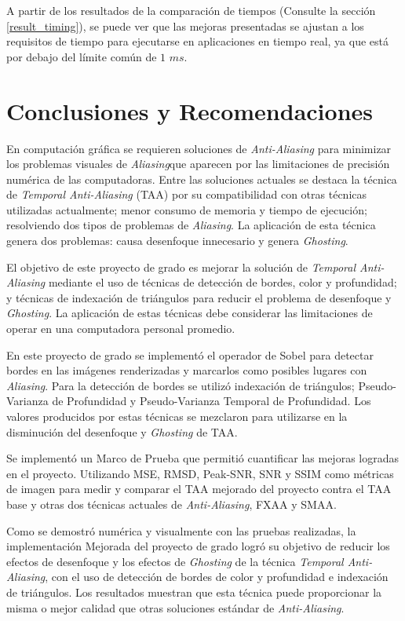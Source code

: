\documentclass[pregrado]{tesis-usb} %
\begin{document}
A partir de los resultados de la comparación de tiempos (Consulte la sección \ref{result_timing}), se puede ver que las mejoras presentadas se ajustan a los requisitos de tiempo para ejecutarse en aplicaciones en tiempo real, ya que está por debajo del límite común de $1$ $ms$.


\chapter{Conclusiones y Recomendaciones}
En computación gráfica se requieren soluciones de \textit{Anti-Aliasing} para minimizar los problemas visuales de \textit{Aliasing}que aparecen por las limitaciones de precisión numérica de las computadoras. Entre las soluciones actuales se destaca la técnica de \textit{Temporal Anti-Aliasing} (TAA) por su compatibilidad con otras técnicas utilizadas actualmente; menor consumo de memoria y tiempo de ejecución; resolviendo dos tipos de problemas de \textit{Aliasing}. La aplicación de esta técnica genera dos problemas: causa desenfoque innecesario y genera \textit{Ghosting}.

El objetivo de este proyecto de grado es mejorar la solución de \textit{Temporal Anti-Aliasing} mediante el uso de técnicas de detección de bordes, color y profundidad; y técnicas de indexación de triángulos para reducir el problema de desenfoque y \textit{Ghosting}. La aplicación de estas técnicas debe considerar las limitaciones de operar en una computadora personal promedio.

En este proyecto de grado se implementó el operador de Sobel para detectar bordes en las imágenes renderizadas y marcarlos como posibles lugares con \textit{Aliasing}. Para la detección de bordes se utilizó indexación de triángulos; Pseudo-Varianza de Profundidad y Pseudo-Varianza Temporal de Profundidad. Los valores producidos por estas técnicas se mezclaron para utilizarse en la disminución del desenfoque y \textit{Ghosting} de TAA. 

Se implementó un Marco de Prueba que permitió cuantificar las mejoras logradas en el proyecto. Utilizando MSE, RMSD, Peak-SNR, SNR y SSIM como métricas de imagen para medir y comparar el TAA mejorado del proyecto contra el TAA base y otras dos técnicas actuales de \textit{Anti-Aliasing}, FXAA y SMAA.

Como se demostró numérica y visualmente con las pruebas realizadas, la implementación Mejorada del proyecto de grado logró su objetivo de reducir los efectos de desenfoque y los efectos de \textit{Ghosting} de la técnica \textit{Temporal Anti-Aliasing}, con el uso de detección de bordes de color y profundidad e indexación de triángulos. Los resultados muestran que esta técnica puede proporcionar la misma o mejor calidad que otras soluciones estándar de \textit{Anti-Aliasing}. 
\end{document}
